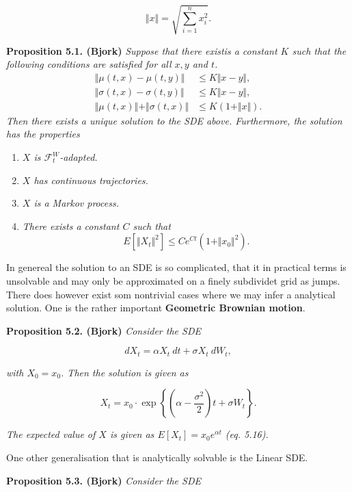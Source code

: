 \documentclass[a4paper,12pt,openany]{book}
\providecommand{\tightlist}{%
 \setlength{\itemsep}{0pt}\setlength{\parskip}{0pt}}
\begin{document}
\[
\Vert x\Vert=\sqrt{\sum_{i=1}^nx_i^2}.
\]

\textbf{Proposition 5.1. (Bjork)} \emph{Suppose that there existis a constant \(K\) such that the following conditions are satisfied for all \(x,y\) and \(t\).}
\begin{align*}
\Vert \mu(t,x) - \mu(t,y) \Vert &\le K\Vert x-y\Vert,\tag{5.6}\\
\Vert \sigma(t,x) - \sigma(t,y) \Vert &\le K\Vert x-y\Vert,\tag{5.7}\\
\Vert \mu(t,x) \Vert +\Vert \sigma(t,x) \Vert&\le K(1+\Vert x\Vert).\tag{5.8}
\end{align*}
\emph{Then there exists a unique solution to the SDE above. Furthermore, the solution has the properties}

\begin{enumerate}
\def\labelenumi{\arabic{enumi}.}
\tightlist
\item
  \emph{\(X\) is \(\mathcal{F}_t^W\)-adapted.}
\item
  \emph{\(X\) has continuous trajectories.}
\item
  \emph{\(X\) is a Markov process.}
\item
  \emph{There exists a constant \(C\) such that}
  \[
    E[\Vert X_t\Vert^2]\le Ce^{Ct}(1+\Vert x_0\Vert^2).\tag{5.9}
    \]
\end{enumerate}

In genereal the solution to an SDE is so complicated, that it in practical terms is unsolvable and may only be approximated on a finely subdividet grid as jumps. There does however exist som nontrivial cases where we may infer a analytical solution. One is the rather important \textbf{Geometric Brownian motion}.

\textbf{Proposition 5.2. (Bjork)} \emph{Consider the SDE}

\[
dX_t=\alpha X_t\ dt+\sigma X_t\ dW_t,\tag{5.13}
\]

\emph{with \(X_0=x_0\). Then the solution is given as}

\[
X_t=x_0\cdot \exp\left\{\left(\alpha- \frac{\sigma^2}{2}\right)t+\sigma W_t\right\}.\tag{5.15}
\]

\emph{The expected value of \(X\) is given as \(E[X_t]=x_0e^{\alpha t}\) (eq. 5.16).}

One other generalisation that is analytically solvable is the Linear SDE.

\textbf{Proposition 5.3. (Bjork)} \emph{Consider the SDE}
\end{document}
